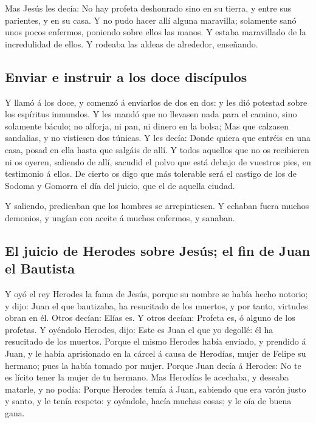  Mas Jesús les decía: No hay profeta deshonrado sino en su
tierra, y entre sus parientes, y en su casa.  Y no pudo
hacer allí alguna maravilla; solamente sanó unos pocos enfermos,
poniendo sobre ellos las manos.  Y estaba maravillado de
la incredulidad de ellos. Y rodeaba las aldeas de alrededor, enseñando.

\hypertarget{enviar-e-instruir-a-los-doce-discuxedpulos}{%
\subsection{Enviar e instruir a los doce
discípulos}\label{enviar-e-instruir-a-los-doce-discuxedpulos}}

 Y llamó á los doce, y comenzó á enviarlos de dos en dos:
y les dió potestad sobre los espíritus inmundos.  Y les
mandó que no llevasen nada para el camino, sino solamente báculo; no
alforja, ni pan, ni dinero en la bolsa;  Mas que calzasen
sandalias, y no vistiesen dos túnicas.  Y les decía:
Donde quiera que entréis en una casa, posad en ella hasta que salgáis de
allí.  Y todos aquellos que no os recibieren ni os
oyeren, saliendo de allí, sacudid el polvo que está debajo de vuestros
pies, en testimonio á ellos. De cierto os digo que más tolerable será el
castigo de los de Sodoma y Gomorra el día del juicio, que el de aquella
ciudad.

 Y saliendo, predicaban que los hombres se arrepintiesen.
 Y echaban fuera muchos demonios, y ungían con aceite á
muchos enfermos, y sanaban.

\hypertarget{el-juicio-de-herodes-sobre-jesuxfas-el-fin-de-juan-el-bautista}{%
\subsection{El juicio de Herodes sobre Jesús; el fin de Juan el
Bautista}\label{el-juicio-de-herodes-sobre-jesuxfas-el-fin-de-juan-el-bautista}}

 Y oyó el rey Herodes la fama de Jesús, porque su nombre
se había hecho notorio; y dijo: Juan el que bautizaba, ha resucitado de
los muertos, y por tanto, virtudes obran en él.  Otros
decían: Elías es. Y otros decían: Profeta es, ó alguno de los profetas.
 Y oyéndolo Herodes, dijo: Este es Juan el que yo
degollé: él ha resucitado de los muertos.  Porque el
mismo Herodes había enviado, y prendido á Juan, y le había aprisionado
en la cárcel á causa de Herodías, mujer de Felipe su hermano; pues la
había tomado por mujer.  Porque Juan decía á Herodes: No
te es lícito tener la mujer de tu hermano.  Mas Herodías
le acechaba, y deseaba matarle, y no podía:  Porque
Herodes temía á Juan, sabiendo que era varón justo y santo, y le tenía
respeto: y oyéndole, hacía muchas cosas; y le oía de buena gana.

